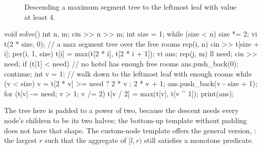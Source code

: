 \begin{figure}[htbp]
\centering
{}
\caption{Descending a maximum segment tree to the leftmost leaf with value at least 4.}
\label{fig:hotel}
\end{figure}

\begin{code}
void solve() {
    int n, m;
    cin >> n >> m;
    int size = 1;
    while (size < n) size *= 2;
    vi t(2 * size, 0);  // a max segment tree over the free rooms
    rep(i, n) cin >> t[size + i];
    per(i, 1, size) t[i] = max(t[2 * i], t[2 * i + 1]);
    vi ans;
    rep(j, m) {
        ll need;
        cin >> need;
        if (t[1] < need) {  // no hotel has enough free rooms
            ans.push_back(0);
            continue;
        }
        int v = 1;  // walk down to the leftmost leaf with enough rooms
        while (v < size) v = t[2 * v] >= need ? 2 * v : 2 * v + 1;
        ans.push_back(v - size + 1);
        for (t[v] -= need; v > 1; v /= 2) t[v / 2] = max(t[v], t[v ^ 1]);
    }
    print(ans);
}
\end{code}

The tree here is padded to a power of two, because the descent needs every node's children to be its two halves; the bottom-up
template without padding does not have that shape. The custom-node template offers the general version, :
the largest $r$ such that the aggregate of $[l, r)$ still satisfies a monotone predicate.

